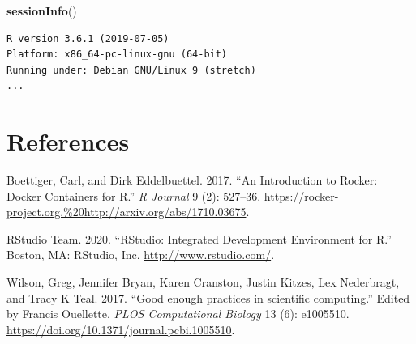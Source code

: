 \documentclass[
]{article}
\newenvironment{Shaded}{\begin{snugshade}}{\end{snugshade}}
\newcommand{\KeywordTok}[1]{\textcolor[rgb]{0.13,0.29,0.53}{\textbf{#1}}}
\newcommand{\NormalTok}[1]{#1}
\newlength{\cslhangindent}
\newenvironment{cslreferences}%
  {\setlength{\parindent}{0pt}%
  \everypar{\setlength{\hangindent}{\cslhangindent}}\ignorespaces}%
  {\par}
\begin{document}
\begin{Shaded}
\begin{Highlighting}[]
\KeywordTok{sessionInfo}\NormalTok{()}
\end{Highlighting}
\end{Shaded}

\begin{verbatim}
R version 3.6.1 (2019-07-05)
Platform: x86_64-pc-linux-gnu (64-bit)
Running under: Debian GNU/Linux 9 (stretch)
...
\end{verbatim}

\clearpage

\hypertarget{references}{%
\section*{References}\label{references}}

\hypertarget{refs}{}
\begin{cslreferences}
\leavevmode\hypertarget{ref-Boettiger2017}{}%
Boettiger, Carl, and Dirk Eddelbuettel. 2017. ``An Introduction to Rocker: Docker Containers for R.'' \emph{R Journal} 9 (2): 527--36. \url{https://rocker-project.org.\%20http://arxiv.org/abs/1710.03675}.

\leavevmode\hypertarget{ref-RStudioTeam2020}{}%
RStudio Team. 2020. ``RStudio: Integrated Development Environment for R.'' Boston, MA: RStudio, Inc. \url{http://www.rstudio.com/}.

\leavevmode\hypertarget{ref-Wilson2017}{}%
Wilson, Greg, Jennifer Bryan, Karen Cranston, Justin Kitzes, Lex Nederbragt, and Tracy K Teal. 2017. ``Good enough practices in scientific computing.'' Edited by Francis Ouellette. \emph{PLOS Computational Biology} 13 (6): e1005510. \url{https://doi.org/10.1371/journal.pcbi.1005510}.
\end{cslreferences}
\end{document}
